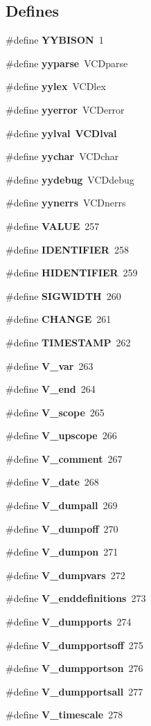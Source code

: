 \subsection*{Defines}
\begin{CompactItemize}
\item 
\#define {\bf YYBISON}\ 1
\item 
\#define {\bf yyparse}\ VCDparse
\item 
\#define {\bf yylex}\ VCDlex
\item 
\#define {\bf yyerror}\ VCDerror
\item 
\#define {\bf yylval}\ {\bf VCDlval}
\item 
\#define {\bf yychar}\ VCDchar
\item 
\#define {\bf yydebug}\ VCDdebug
\item 
\#define {\bf yynerrs}\ VCDnerrs
\item 
\#define {\bf VALUE}\ 257
\item 
\#define {\bf IDENTIFIER}\ 258
\item 
\#define {\bf HIDENTIFIER}\ 259
\item 
\#define {\bf SIGWIDTH}\ 260
\item 
\#define {\bf CHANGE}\ 261
\item 
\#define {\bf TIMESTAMP}\ 262
\item 
\#define {\bf V\_\-var}\ 263
\item 
\#define {\bf V\_\-end}\ 264
\item 
\#define {\bf V\_\-scope}\ 265
\item 
\#define {\bf V\_\-upscope}\ 266
\item 
\#define {\bf V\_\-comment}\ 267
\item 
\#define {\bf V\_\-date}\ 268
\item 
\#define {\bf V\_\-dumpall}\ 269
\item 
\#define {\bf V\_\-dumpoff}\ 270
\item 
\#define {\bf V\_\-dumpon}\ 271
\item 
\#define {\bf V\_\-dumpvars}\ 272
\item 
\#define {\bf V\_\-enddefinitions}\ 273
\item 
\#define {\bf V\_\-dumpports}\ 274
\item 
\#define {\bf V\_\-dumpportsoff}\ 275
\item 
\#define {\bf V\_\-dumpportson}\ 276
\item 
\#define {\bf V\_\-dumpportsall}\ 277
\item 
\#define {\bf V\_\-timescale}\ 278

\end{CompactItemize}
